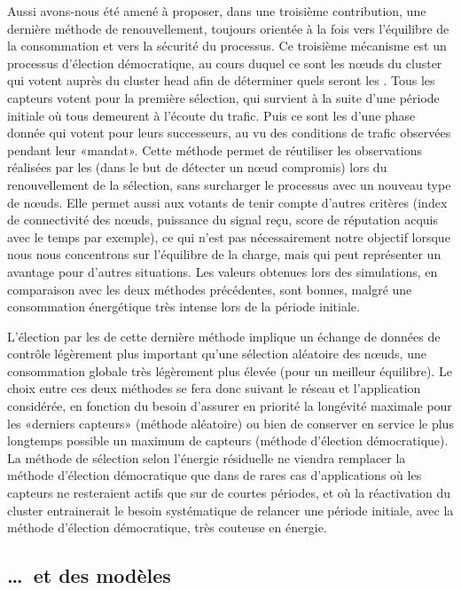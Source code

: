 Aussi avons-nous été amené à proposer, dans une troisième contribution, une dernière méthode de renouvellement, toujours orientée à la fois vers l'équilibre de la consommation et vers la sécurité du processus.
Ce troisième mécanisme est un processus d'élection démocratique, au cours duquel ce sont les nœuds du cluster qui votent auprès du cluster head afin de déterminer quels seront les \cnst.
Tous les capteurs votent pour la première sélection, qui survient à la suite d'une période initiale où tous demeurent à l'écoute du trafic.
Puis ce sont les \cnst d'une phase donnée qui votent pour leurs successeurs, au vu des conditions de trafic observées pendant leur «mandat».
Cette méthode permet de réutiliser les observations réalisées par les \cnst (dans le but de détecter un nœud compromis) lors du renouvellement de la sélection, sans surcharger le processus avec un nouveau type de nœuds.
Elle permet aussi aux votants de tenir compte d'autres critères (index de connectivité des nœuds, puissance du signal reçu, score de réputation acquis avec le temps par exemple), ce qui n'est pas nécessairement notre objectif lorsque nous nous concentrons sur l'équilibre de la charge, mais qui peut représenter un avantage pour d'autres situations.
Les valeurs obtenues lors des simulations, en comparaison avec les deux méthodes précédentes, sont bonnes, malgré une consommation énergétique très intense lors de la période initiale.

L'élection par les \cnst de cette dernière méthode implique un échange de données de contrôle légèrement plus important qu'une sélection aléatoire des nœuds, \cad une consommation globale très légèrement plus élevée (pour un meilleur équilibre).
Le choix entre ces deux méthodes se fera donc suivant le réseau et l'application considérée, en fonction du besoin d'assurer en priorité la longévité maximale pour les «derniers capteurs» (méthode aléatoire) ou bien de conserver en service le plus longtemps possible un maximum de capteurs (méthode d'élection démocratique).
La méthode de sélection selon l'énergie résiduelle ne viendra remplacer la méthode d'élection démocratique que dans de rares cas d'applications où les capteurs ne resteraient actifs que sur de courtes périodes, et où la réactivation du cluster entrainerait le besoin systématique de relancer une période initiale, avec la méthode d'élection démocratique, très couteuse en énergie.

    \subsection{\dots\ et des modèles}


